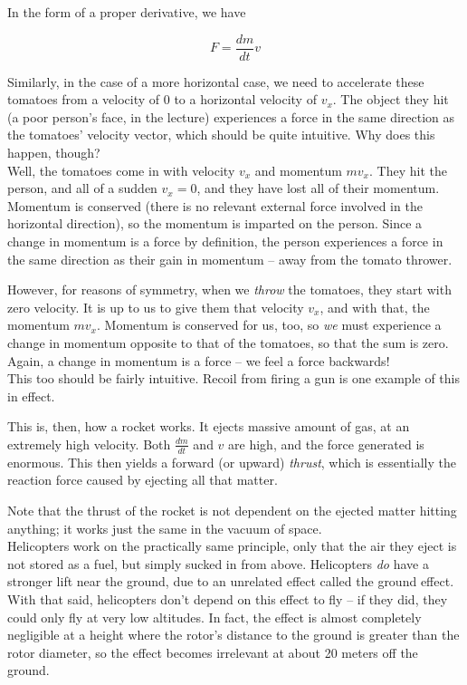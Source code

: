 In the form of a proper derivative, we have

\begin{equation}
F = \frac{dm}{dt} v
\end{equation}

Similarly, in the case of a more horizontal case, we need to accelerate these tomatoes from a velocity of 0 to a horizontal velocity of $v_x$. The object they hit (a poor person's face, in the lecture) experiences a force in the same direction as the tomatoes' velocity vector, which should be quite intuitive. Why does this happen, though?\\
Well, the tomatoes come in with velocity $v_x$ and momentum $m v_x$. They hit the person, and all of a sudden $v_x = 0$, and they have lost all of their momentum. Momentum is conserved (there is no relevant external force involved in the horizontal direction), so the momentum is imparted on the person. Since a change in momentum is a force by definition, the person experiences a force in the same direction as their gain in momentum -- away from the tomato thrower.

However, for reasons of symmetry, when we \emph{throw} the tomatoes, they start with zero velocity. It is up to us to give them that velocity $v_x$, and with that, the momentum $m v_x$. Momentum is conserved for us, too, so \emph{we} must experience a change in momentum opposite to that of the tomatoes, so that the sum is zero. Again, a change in momentum is a force -- we feel a force backwards!\\
This too should be fairly intuitive. Recoil from firing a gun is one example of this in effect.

This is, then, how a rocket works. It ejects massive amount of gas, at an extremely high velocity. Both $\displaystyle \frac{dm}{dt}$ and $v$ are high, and the force generated is enormous. This then yields a forward (or upward) \emph{thrust}, which is essentially the reaction force caused by ejecting all that matter.

Note that the thrust of the rocket is not dependent on the ejected matter hitting anything; it works just the same in the vacuum of space.\\
Helicopters work on the practically same principle, only that the air they eject is not stored as a fuel, but simply sucked in from above. Helicopters \emph{do} have a stronger lift near the ground, due to an unrelated effect called the ground effect. With that said, helicopters don't depend on this effect to fly -- if they did, they could only fly at very low altitudes. In fact, the effect is almost completely negligible at a height where the rotor's distance to the ground is greater than the rotor diameter, so the effect becomes irrelevant at about 20 meters off the ground.

